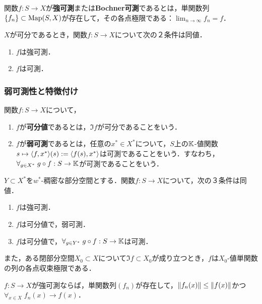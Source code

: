 \documentclass[uplatex,dvipdfmx]{jsreport}
\begin{document}
\begin{definition}
    関数$f:S\to X$が\textbf{強可測}または\textbf{Bochner可測}であるとは，単関数列$\{f_n\}\subset\mathrm{Map}(S,X)$が存在して，その各点極限である：$\lim_{n\to\infty}f_n=f$．
\end{definition}

\begin{lemma}
    $X$が可分であるとき，関数$f:S\to X$について次の２条件は同値．
    \begin{enumerate}
        \item $f$は強可測．
        \item $f$は可測．
    \end{enumerate}
\end{lemma}

\subsubsection{弱可測性と特徴付け}

\begin{definition}
    関数$f:S\to X$について，
    \begin{enumerate}
        \item $f$が\textbf{可分値}であるとは，$\Im f$が可分であることをいう．
        \item $f$が\textbf{弱可測}であるとは，任意の$x^*\in X^*$について，$S$上の$\mathbb{K}$-値関数$s\mapsto\langle f,x^*\rangle(s):=\langle f(s),x^*\rangle$は可測であることをいう．すなわち，$\forall_{g\in X^*}\;g\circ f:S\to\mathbb{K}$が可測であることをいう．
    \end{enumerate}
\end{definition}

\begin{theorem}
    $Y\subset X^*$を$w^*$-稠密な部分空間とする．関数$f:S\to X$について，次の３条件は同値．
    \begin{enumerate}
        \item $f$は強可測．
        \item $f$は可分値で，弱可測．
        \item $f$は可分値で，$\forall_{g\in Y^*}\;g\circ f:S\to\mathbb{K}$は可測．
    \end{enumerate}
    また，ある閉部分空間$X_0\subset X$について$\Im f\subset X_0$が成り立つとき，$f$は$X_0$-値単関数の列の各点収束極限である．
\end{theorem}

\begin{corollary}[単関数列は単調増加に取れる]
    $f:S\to X$が強可測ならば，単関数列$(f_n)$が存在して，$\|f_n(x)\|\le\|f(x)\|$かつ$\forall_{x\in X}\;f_n(x)\to f(x)$．
\end{corollary}
\end{document}
